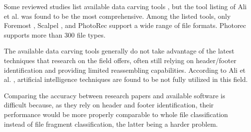 Some reviewed studies list available data carving tools
\cite{ali_review_2018}
\cite{qiu_new_2014}
\cite{nadeem_ashraf_forensic_2013}
\cite{roux_reconstructing_2008}, 
but the tool listing of Ali et al. \cite{ali_review_2018} was found to be the most comprehensive. Among the listed tools, only Foremost \cite{kendall_foremost_2019}, Scalpel \cite{richard_iii_scalpel:_2005}, and PhotoRec \cite{grenier_photorec_2019} support a wide range of file formats. Photorec supports more than 300 file types.

The available data carving tools generally do not take advantage of the latest techniques that research on the field offers, often still relying on header/footer identification and providing limited reassembling capabilities.
According to Ali et al. \cite{ali_review_2018}, artificial intelligence techniques are found to be not fully utilized in this field.

Comparing the accuracy between research papers and available software is difficult because, as they rely on header and footer identification, their performance would be more properly comparable to whole file classification instead of file fragment classification, the latter being a harder problem.
